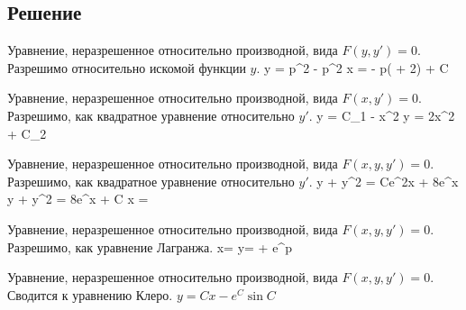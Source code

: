 \subsection{Решение}
\begin{enumerate}
    \solutionItemFirst
        {\equationFirst}
        {
        	Уравнение, неразрешенное относительно производной,
        	вида $ F(y, y') = 0 $. \\
        	Разрешимо относительно искомой функции $ y $.
        }
        {
        	\customCases
        		{y = p^2 - p^2 }
        		{x =  - p( + 2) + C}
        }

	\clearpage

    \solutionItemFirst
	    {\equationSecond}
	    {
	    	Уравнение, неразрешенное относительно производной,
	    	вида $ F(x, y') = 0 $. \\
	    	Разрешимо, как квадратное уравнение относительно $ y' $.
    	}
	    {
	    	\customCases
				{y = C_1 - x^2}
				{y = 2x^2 + C_2}
    	}

	\vspace{2em}

	\solutionItemFirst
		{\equationThird}
		{
			Уравнение, неразрешенное относительно производной,
			вида $ F(x, y, y') = 0 $. \\
			Разрешимо, как квадратное уравнение относительно $ y' $.
		}
		{
			\customCases
				{y + y^2 = Ce^{2x} + 8e^x}
				{y + y^2 = 8e^x + C}
				{x = }
		}

	\vspace{2em}

	\solutionItemFirst
		{\equationFourth}
		{
			Уравнение, неразрешенное относительно производной,
			вида $ F(x, y, y') = 0 $. \\
			Разрешимо, как уравнение Лагранжа.
		}
		{
			\customCases
				{x=}	
				{y= + e^p}
		}

	\clearpage

	\solutionItemFirst
		{\equationFifth}
		{
			Уравнение, неразрешенное относительно производной,
			вида $ F(x, y, y') = 0 $. \\
			Сводится к уравнению Клеро.
		}
		{$ y=Cx-e^C\sin{C} $}

\end{enumerate} 
